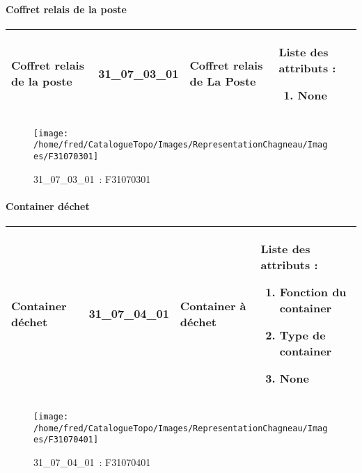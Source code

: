 \documentclass[12pt,titlepage,oneside]{book}
\begin{document}
\paragraph{Coffret relais de la poste}
\noindent
\vspace{\baselineskip}

\renewcommand{\arraystretch}{1.2}
\begin{supertabular}{|p{10cm}|c|p{13cm}|p{12cm}|}
 Coffret relais de la poste & 31\_07\_03\_01 & Coffret relais de La Poste & Liste des attributs :
\begin{enumerate}
  \item None\end{enumerate}
\\
\hline
\end{supertabular}
\begin{figure}[h!]
  \hfill         %
  \begin{minipage}[t]{3cm}
    \begin{center}
      \texttt{[image: /home/fred/CatalogueTopo/Images/RepresentationChagneau/Images/F31070301]}
      \caption[~31\_07\_03\_01]{\small{31\_07\_03\_01~:} \tiny{F31070301}}\label{F31070301}
    \end{center}
  \end{minipage}
\end{figure}


\paragraph{Container déchet}
\noindent
\vspace{\baselineskip}

\renewcommand{\arraystretch}{1.2}
\begin{supertabular}{|p{10cm}|c|p{13cm}|p{12cm}|}
 Container déchet & 31\_07\_04\_01 & Container à déchet & Liste des attributs :
\begin{enumerate}
  \item Fonction du container  \item Type de container  \item None\end{enumerate}
\\
\hline
\end{supertabular}
\begin{figure}[h!]
  \hfill         %
  \begin{minipage}[t]{3cm}
    \begin{center}
      \texttt{[image: /home/fred/CatalogueTopo/Images/RepresentationChagneau/Images/F31070401]}
      \caption[~31\_07\_04\_01]{\small{31\_07\_04\_01~:} \tiny{F31070401}}\label{F31070401}
    \end{center}
  \end{minipage}
\end{figure}
\end{document}
